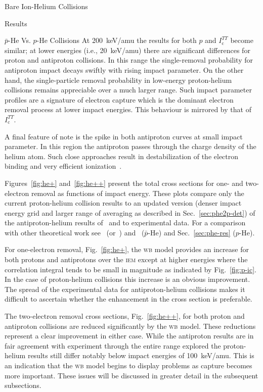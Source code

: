 \documentclass[letterpaper, 11 pt]{report}
\begin{document}
\begin{chapter}{Bare Ion-Helium Collisions \label{chap:p-he2p-he}}
\begin{section}{Results \label{sec:phe2p-res}}
\begin{subsection}{ \texorpdfstring{$\bar{p}$}{pbar}-He Vs. \texorpdfstring{$p$}{p}-He Collisions
                         \label{sec:pbarhe-res}}
         At 200~keV/amu the results for both $p$ and $I^{TT}_\mathrm{c}$ become similar; at lower
         energies (i.e., 20~keV/amu) there are significant differences for proton and antiproton
         collisions. In this range the single-removal probability for antiproton impact decays swiftly
         with rising impact parameter. On the other hand, the single-particle removal probability in
         low-energy proton-helium collisions remains appreciable over a much larger range. Such impact
         parameter profiles are a signature of electron capture which is the dominant electron removal
         process at lower impact energies. This behaviour is mirrored by that of $I^{TT}_\mathrm{c}$.

         A final feature of note is the spike in both antiproton curves at small impact parameter. In
         this region the antiproton passes through the charge density of the helium atom. Such close
         approaches result in destabilization of the electron binding and very efficient
         ionization~\cite{pbarhe-rev}.

         Figures~\ref{fig:he+} and~\ref{fig:he++} present the total cross sections for one- and
         two-electron removal as functions of impact energy. These plots compare only the current
         proton-helium collision results to an updated version (denser impact energy grid and larger
         range of averaging as described in Sec.~\ref{sec:phe2p-det}) of the antiproton-helium results
         of~\cite{pbarhe} and to experimental data. For a comparison with other theoretical work
         see~\cite{thesis} (or~\cite{pbarhe}) and~\cite{new-pbarhe} ($\bar{p}$-He) and
         Sec.~\ref{sec:phe-res} ($p$-He).

         For one-electron removal, Fig.~\ref{fig:he+}, the \textsc{wb} model provides an increase for
         both protons and antiprotons over the \textsc{iem} except at higher energies where the
         correlation integral tends to be small in magnitude as indicated by Fig.~\ref{fig:p-ic}. In the
         case of proton-helium collisions this increase is an obvious improvement. The spread of the
         experimental data for antiproton-helium collisions makes it difficult to ascertain whether the
         enhancement in the cross section is preferable.

         The two-electron removal cross sections, Fig.~\ref{fig:he++}, for both proton and antiproton
         collisions are reduced significantly by the \textsc{wb} model. These reductions represent a
         clear improvement in either case. While the antiproton results are in fair agreement with
         experiment through the entire range explored the proton-helium results still differ notably
         below impact energies of 100~keV/amu. This is an indication that the \textsc{wb} model begins
         to display problems as capture becomes more important. These issues will be discussed in
         greater detail in the subsequent subsections.


\end{subsection}
\end{section}
\end{chapter}
\end{document}
